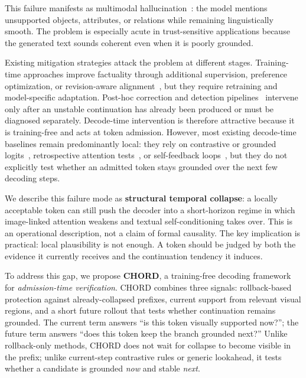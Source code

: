 \documentclass[sigconf,anonymous]{acmart}
\begin{document}
This failure manifests as multimodal hallucination~\cite{bai2025mllm_hallucination_survey,li2023pope,rohrbach2018object,lovenia2023nope,wang2023amber,wu2024relationship_hallucinations,jing2023faithscore}: the model mentions unsupported objects, attributes, or relations while remaining linguistically smooth. The problem is especially acute in trust-sensitive applications because the generated text sounds coherent even when it is poorly grounded.

Existing mitigation strategies attack the problem at different stages. Training-time approaches improve factuality through additional supervision, preference optimization, or revision-aware alignment~\cite{liu2023aligning,chen2024hio,zhang2024reflective_instruction,lee2024volcano,yu2024rlhfv,sun2023llava_rlhf,peng2025sentinel}, but they require retraining and model-specific adaptation. Post-hoc correction and detection pipelines~\cite{yin2023woodpecker,gunjal2024detecting_preventing,zhang2025dhcp,jing2023faithscore} intervene only after an unstable continuation has already been produced or must be diagnosed separately. Decode-time intervention is therefore attractive because it is training-free and acts at token admission. However, most existing decode-time baselines remain predominantly local: they rely on contrastive or grounded logits~\cite{leng2023mitigating,favero2024m3id,deng2024clipguided,wang2024icd,chuang2023dola,jiang2024hacl,kim2024code}, retrospective attention tests~\cite{huang2024opera_cvpr,woo2024ritual,liu2024paying_attention_image,xu2025tarac,kai2024sh2}, or self-feedback loops~\cite{zhang2025degf,cao2025cofidec}, but they do not explicitly test whether an admitted token stays grounded over the next few decoding steps.

We describe this failure mode as \textbf{structural temporal collapse}: a locally acceptable token can still push the decoder into a short-horizon regime in which image-linked attention weakens and textual self-conditioning takes over. This is an operational description, not a claim of formal causality. The key implication is practical: local plausibility is not enough. A token should be judged by both the evidence it currently receives and the continuation tendency it induces.

To address this gap, we propose \textbf{CHORD}, a training-free decoding framework for \emph{admission-time verification}. CHORD combines three signals: rollback-based protection against already-collapsed prefixes, current support from relevant visual regions, and a short future rollout that tests whether continuation remains grounded. The current term answers ``is this token visually supported now?''; the future term answers ``does this token keep the branch grounded next?'' Unlike rollback-only methods, CHORD does not wait for collapse to become visible in the prefix; unlike current-step contrastive rules or generic lookahead, it tests whether a candidate is grounded \emph{now} and stable \emph{next}.
\end{document}

